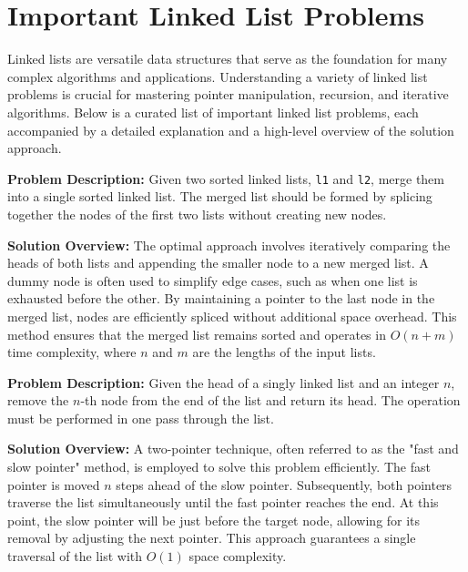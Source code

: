 
\section{Important Linked List Problems}

Linked lists are versatile data structures that serve as the foundation for many complex algorithms and applications. Understanding a variety of linked list problems is crucial for mastering pointer manipulation, recursion, and iterative algorithms. Below is a curated list of important linked list problems, each accompanied by a detailed explanation and a high-level overview of the solution approach.


\textbf{Problem Description:}  
Given two sorted linked lists, \texttt{l1} and \texttt{l2}, merge them into a single sorted linked list. The merged list should be formed by splicing together the nodes of the first two lists without creating new nodes.

\textbf{Solution Overview:}  
The optimal approach involves iteratively comparing the heads of both lists and appending the smaller node to a new merged list. A dummy node is often used to simplify edge cases, such as when one list is exhausted before the other. By maintaining a pointer to the last node in the merged list, nodes are efficiently spliced without additional space overhead. This method ensures that the merged list remains sorted and operates in \(O(n + m)\) time complexity, where \(n\) and \(m\) are the lengths of the input lists.


\textbf{Problem Description:}  
Given the head of a singly linked list and an integer \(n\), remove the \(n\)-th node from the end of the list and return its head. The operation must be performed in one pass through the list.

\textbf{Solution Overview:}  
A two-pointer technique, often referred to as the "fast and slow pointer" method, is employed to solve this problem efficiently. The fast pointer is moved \(n\) steps ahead of the slow pointer. Subsequently, both pointers traverse the list simultaneously until the fast pointer reaches the end. At this point, the slow pointer will be just before the target node, allowing for its removal by adjusting the next pointer. This approach guarantees a single traversal of the list with \(O(1)\) space complexity.

